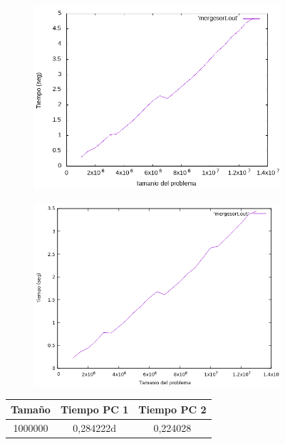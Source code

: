 \documentclass[12pt,spanish]{article}
\begin{document}
\begin{figure}[H]
\centering
\begin{subfigure}[b]{0.45\textwidth}
\includegraphics[scale=0.45]{empirica_mergesort.png}
\caption{}
\end{subfigure}
\quad
\begin{subfigure}[b]{0.45\textwidth}
\includegraphics[scale=0.45]{empirica_mergesort_2.png}
\caption{}
\end{subfigure}
\begin{tabular}{|c|c|c|}
\hline
\textbf{Tamaño} & \textbf{Tiempo PC 1} & \textbf{Tiempo PC 2} \\
\hline
1000000 & 0,284222d & 0,224028 \\

\end{tabular}
\end{figure}
\end{document}
